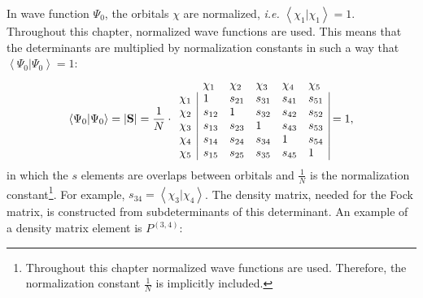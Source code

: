 In wave function $\Psi_0$, the orbitals $\chi$ are normalized, \textit{i.e.} $\left< \chi_1 | \chi_1 \right> = 1$. Throughout this chapter, normalized wave functions are used. This means that the determinants are multiplied by normalization constants in such a way that $\left< \Psi_0 |  \Psi_0 \right> = 1$:
\begin{equation}
\left < \Psi_0 | \Psi_0 \right> = | \mathbf{S} | = \frac{1}{N} \cdot
\begin{array}{llllll}
 &  \chi_1 & \chi_2 & \chi_3 & \chi_4 & \chi_5 \\
 \chi_1 & \multicolumn{1}{|l}{ 1 } & s_{21} & s_{31} & s_{41} & \multicolumn{1}{l|}{ s_{51} } \\
 \chi_2 & \multicolumn{1}{|l}{ s_{12} } & 1 & s_{32} & s_{42} & \multicolumn{1}{l|}{ s_{52} } \\
 \chi_3 & \multicolumn{1}{|l}{ s_{13} } & s_{23} & 1 & s_{43} & \multicolumn{1}{l|}{ s_{53} } \\
 \chi_4 & \multicolumn{1}{|l}{ s_{14} } & s_{24} & s_{34} & 1 & \multicolumn{1}{l|}{ s_{54} } \\
 \chi_5 & \multicolumn{1}{|l}{ s_{15} } & s_{25} & s_{35} & s_{45} & \multicolumn{1}{l|}{ 1 }
\end{array} = 1,
\label{ch2.eq.s0g}
\end{equation}
in which the $s$ elements are overlaps between orbitals and $\frac{1}{N}$ is the normalization constant\footnote{Throughout this chapter normalized wave functions are used. Therefore, the normalization constant $\frac{1}{N}$ is implicitly included.}. For example, $s_{34} = \left< \chi_3 | \chi_4 \right>$. The density matrix, needed for the Fock matrix, is constructed from subdeterminants of this determinant. An example of a density matrix element is $P^{(3,4)}$:

